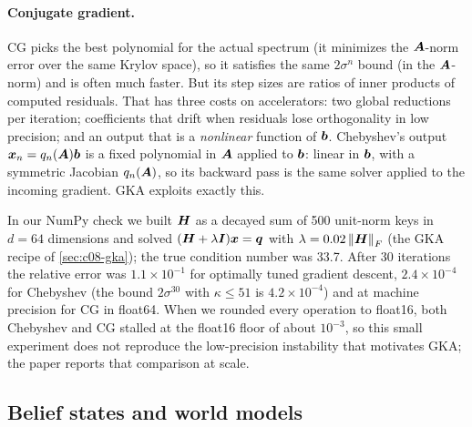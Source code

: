 \paragraph{Conjugate gradient.} CG \citep{c08-hestenes1952cg} picks the best polynomial for the
actual spectrum (it minimizes the $\bm{A}$-norm error over the same Krylov space), so it satisfies the
same $2\sigma^n$ bound (in the $\bm{A}$-norm) and is often much faster. But its step sizes are ratios of inner products of
computed residuals. That has three costs on accelerators: two global reductions per iteration;
coefficients that drift when residuals lose orthogonality in low precision; and an output that is a
\emph{nonlinear} function of $\bm{b}$. Chebyshev's output $\bm{x}_n=q_n(\bm{A})\bm{b}$ is a fixed polynomial
in $\bm{A}$ applied to $\bm{b}$: linear in $\bm{b}$, with a symmetric Jacobian $q_n(\bm{A})$, so its backward
pass is the same solver applied to the incoming gradient. GKA exploits exactly this.

\begin{example}\label{ex:c08-race}
In our NumPy check we built $\bm{H}$ as a decayed sum of 500 unit-norm keys in $d=64$ dimensions and
solved $(\bm{H}+\lambda\bm{I})\bm{x}=\bm{q}$ with $\lambda=0.02\left\lVert \bm{H}\right\rVert_F$ (the GKA recipe of
\cref{sec:c08-gka}); the true condition number was 33.7. After 30 iterations the relative error was
$1.1\times10^{-1}$ for optimally tuned gradient descent, $2.4\times10^{-4}$ for Chebyshev (the
bound $2\sigma^{30}$ with $\kappa\le51$ is $4.2\times10^{-4}$) and at machine precision for CG in
float64. When we rounded every operation to float16, both Chebyshev and CG stalled at the float16
floor of about $10^{-3}$, so this small experiment does not reproduce the low-precision instability
that motivates GKA; the paper reports that comparison at scale.
\end{example}

\subsection{Belief states and world models}\label{sec:c08-belief}

